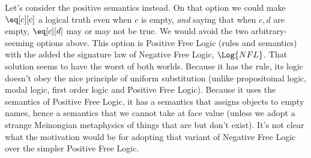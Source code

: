 \documentclass[../../../include/open-logic-section]{subfiles}
\begin{document}
Let's consider the positive semantics instead. On that option we could
make $\eq[c][c]$ a logical truth even when $c$ is empty, \emph{and} 
saying that when $c,d$ are empty, $\eq[c][d]$ may or may not be true.
We would avoid the two arbitrary-seeming options above. This option 
is Positive Free Logic (rules and semantics) with the added
the signature law of Negative Free Logic, $\Log{NFL}$. That solution 
seems to have the worst of both worlds. Because it has the  rule, 
its logic doesn't obey the nice principle of uniform substitution (unlike 
propositoinal logic, modal logic, first order logic and Positive Free Logic).
Because it uses the semantics of Positive Free Logic, it has a semantics
that assigns objects to empty names, hence a semantics that we cannot 
take at face value (unless we adopt a strange Meinongian metaphysics 
of things that are but don't exist). It's not clear what the motivation
would be for adopting that variant of Negative Free Logic over the 
simpler Positive Free Logic. 
\end{document}
